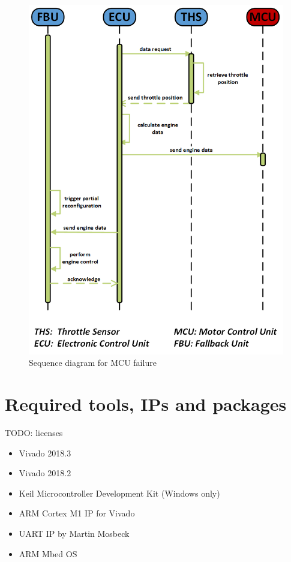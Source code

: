 \begin{figure}[h!]
    \centering
    \includegraphics[width=\textwidth]{figures/sequence_mcu_fail.png}
    \caption{Sequence diagram for \gls{MCU} failure}\label{fig:sequenceMCUFailure}
\end{figure}

\section{Required tools, \glspl{IP} and packages}
TODO: licenses
\begin{itemize}
    \item Vivado 2018.3
    \item Vivado 2018.2
    \item Keil Microcontroller Development Kit (Windows only)
    \item ARM Cortex M1 IP for Vivado
    \item UART IP by Martin Mosbeck
    \item ARM Mbed OS
\end{itemize}
